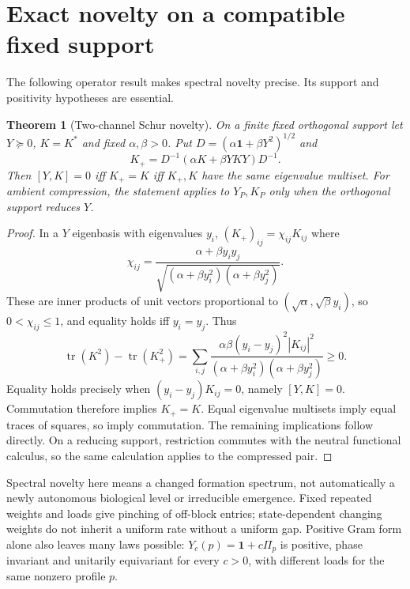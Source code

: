 \documentclass[11pt,letterpaper]{article}
\newcommand{\tr}{\operatorname{tr}}
\newcommand{\Id}{\mathbf 1}
\newtheorem{theorem}{Theorem}[section]
\theoremstyle{definition}
\numberwithin{equation}{section}
\begin{document}
\section{Exact novelty on a compatible fixed support}
The following operator result makes spectral novelty precise. Its support and positivity hypotheses are essential.
\begin{theorem}[Two-channel Schur novelty]\label{novelty}
On a finite fixed orthogonal support let $Y\succeq0$, $K=K^*$ and fixed $\alpha,\beta>0$. Put $D=(\alpha\Id+\beta Y^2)^{1/2}$ and
\begin{equation}
K_+=D^{-1}(\alpha K+\beta YKY)D^{-1}.
\end{equation}
Then $[Y,K]=0$ iff $K_+=K$ iff $K_+,K$ have the same eigenvalue multiset. For ambient compression, the statement applies to $Y_P,K_P$ only when the orthogonal support reduces $Y$.
\end{theorem}
\begin{proof}
In a $Y$ eigenbasis with eigenvalues $y_i$, $(K_+)_{ij}=\chi_{ij}K_{ij}$ where
\begin{equation}\label{chi}
\chi_{ij}=\frac{\alpha+\beta y_iy_j}{\sqrt{(\alpha+\beta y_i^2)(\alpha+\beta y_j^2)}}.
\end{equation}
These are inner products of unit vectors proportional to $(\sqrt\alpha,\sqrt\beta y_i)$, so $0<\chi_{ij}\leq1$, and equality holds iff $y_i=y_j$. Thus
\begin{equation}
\tr(K^2)-\tr(K_+^2)
=\sum_{i,j}\frac{\alpha\beta(y_i-y_j)^2|K_{ij}|^2}{(\alpha+\beta y_i^2)(\alpha+\beta y_j^2)}\geq0.
\end{equation}
Equality holds precisely when $(y_i-y_j)K_{ij}=0$, namely $[Y,K]=0$. Commutation therefore implies $K_+=K$. Equal eigenvalue multisets imply equal traces of squares, so imply commutation. The remaining implications follow directly. On a reducing support, restriction commutes with the neutral functional calculus, so the same calculation applies to the compressed pair.
\end{proof}
Spectral novelty here means a changed formation spectrum, not automatically a newly autonomous biological level or irreducible emergence. Fixed repeated weights and loads give pinching of off-block entries; state-dependent changing weights do not inherit a uniform rate without a uniform gap. Positive Gram form alone also leaves many laws possible: $Y_c(p)=\Id+c\Pi_p$ is positive, phase invariant and unitarily equivariant for every $c>0$, with different loads for the same nonzero profile $p$.
\end{document}
